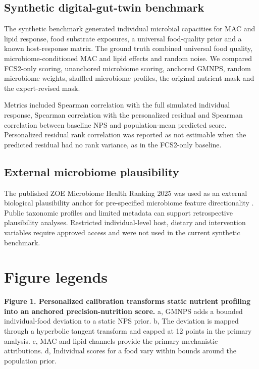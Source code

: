 \subsection*{Synthetic digital-gut-twin benchmark}

The synthetic benchmark generated individual microbial capacities for MAC and
lipid response, food substrate exposures, a universal food-quality prior and a
known host-response matrix. The ground truth combined universal food quality,
microbiome-conditioned MAC and lipid effects and random noise. We compared
FCS2-only scoring, unanchored microbiome scoring, anchored GMNPS, random
microbiome weights, shuffled microbiome profiles, the original nutrient mask
and the expert-revised mask.

Metrics included Spearman correlation with the full simulated individual
response, Spearman correlation with the personalized residual and Spearman
correlation between baseline NPS and population-mean predicted score.
Personalized residual rank correlation was reported as not estimable when the
predicted residual had no rank variance, as in the FCS2-only baseline.

\subsection*{External microbiome plausibility}

The published ZOE Microbiome Health Ranking 2025 was used as an external
biological plausibility anchor for pre-specified microbiome feature
directionality \cite{asnicar2025gut}. Public taxonomic profiles and limited
metadata can support retrospective plausibility analyses. Restricted
individual-level host, dietary and intervention variables require approved
access and were not used in the current synthetic benchmark.

\section*{Figure legends}

\textbf{Figure 1. Personalized calibration transforms static nutrient profiling
into an anchored precision-nutrition score.} a, GMNPS adds a bounded
individual-food deviation to a static NPS prior. b, The deviation is mapped
through a hyperbolic tangent transform and capped at 12 points in the primary
analysis. c, MAC and lipid channels provide the primary mechanistic
attributions. d, Individual scores for a food vary within bounds around the
population prior.

